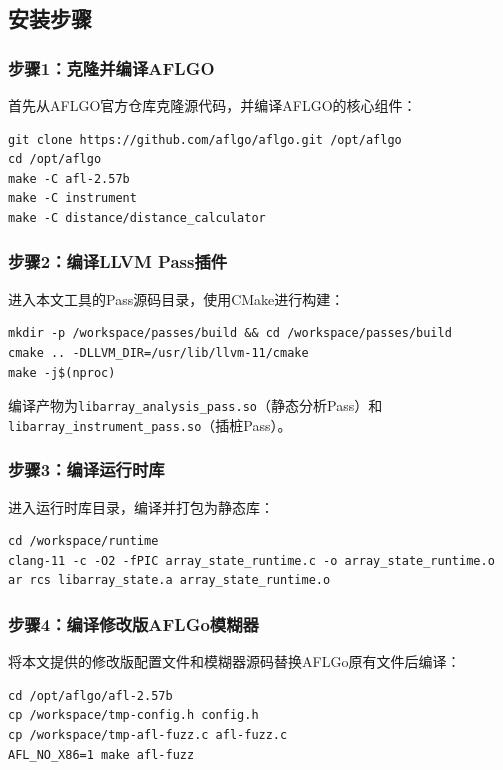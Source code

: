 \documentclass[bachelor]{njupthesis}
\begin{document}
\subsection{安装步骤}

\subsubsection{步骤1：克隆并编译AFLGO}

首先从AFLGO官方仓库克隆源代码，并编译AFLGO的核心组件：

\begin{verbatim}
git clone https://github.com/aflgo/aflgo.git /opt/aflgo
cd /opt/aflgo
make -C afl-2.57b
make -C instrument
make -C distance/distance_calculator
\end{verbatim}

\subsubsection{步骤2：编译LLVM Pass插件}

进入本文工具的Pass源码目录，使用CMake进行构建：

\begin{verbatim}
mkdir -p /workspace/passes/build && cd /workspace/passes/build
cmake .. -DLLVM_DIR=/usr/lib/llvm-11/cmake
make -j$(nproc)
\end{verbatim}

编译产物为\texttt{libarray\_analysis\_pass.so}（静态分析Pass）和\texttt{libarray\_instrument\_pass.so}（插桩Pass）。

\subsubsection{步骤3：编译运行时库}

进入运行时库目录，编译并打包为静态库：

\begin{verbatim}
cd /workspace/runtime
clang-11 -c -O2 -fPIC array_state_runtime.c -o array_state_runtime.o
ar rcs libarray_state.a array_state_runtime.o
\end{verbatim}

\subsubsection{步骤4：编译修改版AFLGo模糊器}

将本文提供的修改版配置文件和模糊器源码替换AFLGo原有文件后编译：

\begin{verbatim}
cd /opt/aflgo/afl-2.57b
cp /workspace/tmp-config.h config.h
cp /workspace/tmp-afl-fuzz.c afl-fuzz.c
AFL_NO_X86=1 make afl-fuzz
\end{verbatim}
\end{document}
